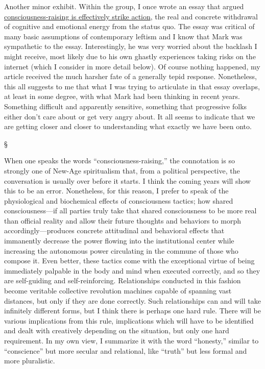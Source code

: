 \documentclass[a4paper,12pt,margin=.5in]{article}
\begin{document}
Another minor exhibit. Within the group, I once wrote an essay that
argued
\href{http://www.weareplanc.org/blog/consciousness-raising-is-social-strike/}{consciousness-raising
is effectively strike action}, the real and concrete withdrawal of
cognitive and emotional energy from the status quo. The essay was
critical of many basic assumptions of contemporary leftism and I know
that Mark was sympathetic to the essay. Interestingly, he was very
worried about the backlash I might receive, most likely due to his own
ghastly experiences taking risks on the internet (which I consider in
more detail below). Of course nothing happened, my article received the
much harsher fate of a generally tepid response. Nonetheless, this all
suggests to me that what I was trying to articulate in that essay
overlaps, at least in some degree, with what Mark had been thinking in
recent years. Something difficult and apparently sensitive, something
that progressive folks either don't care about or get very angry about.
It all seems to indicate that we are getting closer and closer to
understanding what exactly we have been onto.

§

When one speaks the words ``consciousness-raising,'' the connotation is
so strongly one of New-Age spiritualism that, from a political
perspective, the conversation is usually over before it starts. I think
the coming years will show this to be an error. Nonetheless, for this
reason, I prefer to speak of the physiological and biochemical effects
of consciousness tactics; how shared consciousness---if all parties
truly take that shared consciousness to be more real than official
reality and allow their future thoughts and behaviors to morph
accordingly---produces concrete attitudinal and behavioral effects that
immanently decrease the power flowing into the institutional center
while increasing the autonomous power circulating in the commune of
those who compose it. Even better, these tactics come with the
exceptional virtue of being immediately palpable in the body and mind
when executed correctly, and so they are self-guiding and
self-reinforcing. Relationships conducted in this fashion become
veritable collective revolution machines capable of spanning vast
distances, but only if they are done correctly. Such relationships can
and will take infinitely different forms, but I think there is perhaps
one hard rule. There will be various implications from this rule,
implications which will have to be identified and dealt with creatively
depending on the situation, but only one hard requirement. In my own
view, I summarize it with the word ``honesty,'' similar to
``conscience'' but more secular and relational, like ``truth'' but less
formal and more pluralistic.
\end{document}
